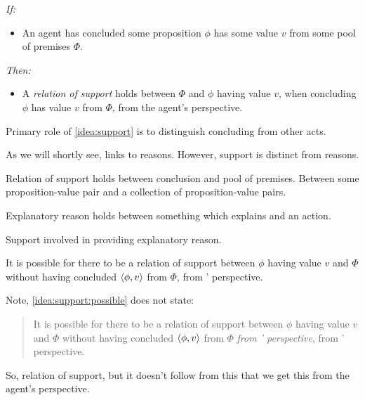 \begin{note}
  \begin{idea}[Support I]
    \label{idea:support}
    \emph{If:}
    \begin{itemize}
    \item
      An agent has concluded some proposition \(\phi\) has some value \(v\) from some pool of premises \(\Phi\).
    \end{itemize}
    \emph{Then:}
    \begin{itemize}
    \item
      A \emph{relation of support} holds between \(\Phi\) and \(\phi\) having value \(v\), when concluding \(\phi\) has value \(v\) from \(\Phi\), from the agent's perspective.
    \end{itemize}
    \vspace{-\baselineskip}
  \end{idea}

  Primary role of \autoref{idea:support} is to distinguish concluding from other acts.
\end{note}

\begin{note}
  As we will shortly see, links to reasons.
  However, support is distinct from reasons.

  Relation of support holds between conclusion and pool of premises.
  Between some proposition-value pair and a collection of proposition-value pairs.

  Explanatory reason holds between something which explains and an action.

  Support involved in providing explanatory reason.
\end{note}

\begin{note}
  \begin{idea}[Support II]
    \label{idea:support:possible}
    It is possible for there to be a relation of support between \(\phi\) having value \(v\) and \(\Phi\) without \vAgent{} having concluded \(\langle \phi, v \rangle\) from \(\Phi\), from \vAgent{}' perspective.
  \end{idea}

  Note, \autoref{idea:support:possible} does not state:

  \begin{quote}
    It is possible for there to be a relation of support between \(\phi\) having value \(v\) and \(\Phi\) without \vAgent{} having concluded \(\langle \phi, v \rangle\) from \(\Phi\) \emph{from \vAgent{}' perspective}, from \vAgent{}' perspective.
  \end{quote}

  So, relation of support, but it doesn't follow from this that we get this from the agent's perspective.
\end{note}

